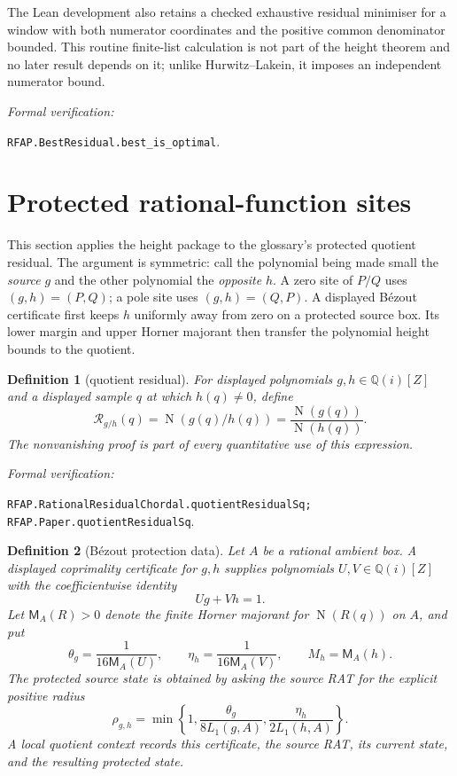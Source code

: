 \documentclass[11pt]{article}
\newtheorem{definition}[definition]{Definition}
\newcommand{\Qi}{\mathbb{Q}(i)}
\newcommand{\Norm}[1]{\operatorname{N}\!\left(#1\right)}
\newcommand{\leanref}[1]{\par\smallskip\noindent
  \emph{Formal verification:}\par\nobreak
  {\raggedright\nolinkurl{#1}.\par}}
\begin{document}
The Lean development also retains a checked exhaustive residual minimiser for
a window with both numerator coordinates and the positive common denominator
bounded.  This routine finite-list calculation is not part of the height
theorem and no later result depends on it; unlike Hurwitz--Lakein, it imposes
an independent numerator bound.

\leanref{RFAP.BestResidual.best_is_optimal}

\section{Protected rational-function sites}
\label{sec:quotients}

This section applies the height package to the glossary's protected quotient
residual.  The argument is symmetric: call the polynomial being made small
the \emph{source} $g$ and the other polynomial the \emph{opposite} $h$.  A
zero site of $P/Q$ uses $(g,h)=(P,Q)$; a pole site uses $(g,h)=(Q,P)$.  A
displayed B\'ezout certificate first keeps $h$ uniformly away from zero on a
protected source box.  Its lower margin and upper Horner majorant then
transfer the polynomial height bounds to the quotient.

\begin{definition}[quotient residual]
\label{def:quotient-residual}
For displayed polynomials $g,h\in\Qi[Z]$ and a displayed sample $q$ at which
$h(q)\ne0$, define
\begin{equation}
\label{eq:quotient-residual}
              \mathcal R_{g/h}(q)
                 =\Norm{g(q)/h(q)}
                 =\frac{\Norm{g(q)}}{\Norm{h(q)}}.
\end{equation}
The nonvanishing proof is part of every quantitative use of this expression.
\end{definition}

\leanref{RFAP.RationalResidualChordal.quotientResidualSq;
RFAP.Paper.quotientResidualSq}

\begin{definition}[B\'ezout protection data]
\label{def:bezout-protection}
Let $A$ be a rational ambient box.  A displayed coprimality certificate for
$g,h$ supplies polynomials $U,V\in\Qi[Z]$ with the coefficientwise identity
\begin{equation}
\label{eq:bezout-protection}
                            Ug+Vh=1.
\end{equation}
Let $\mathsf M_A(R)>0$ denote the finite Horner majorant for
$\Norm{R(q)}$ on $A$, and put
\begin{equation}
\label{eq:protection-margins}
 \theta_g=\frac1{16\mathsf M_A(U)},
 \qquad
 \eta_h=\frac1{16\mathsf M_A(V)},
 \qquad
 M_h=\mathsf M_A(h).
\end{equation}
The \emph{protected source state} is obtained by asking the source RAT for
the explicit positive radius
\begin{equation}
\label{eq:protection-radius}
 \rho_{g,h}=\min\left\{1,
   \frac{\theta_g}{8L_1(g,A)},
   \frac{\eta_h}{2L_1(h,A)}\right\}.
\end{equation}
A local quotient context records this certificate, the source RAT, its
current state, and the resulting protected state.
\end{definition}
\end{document}

